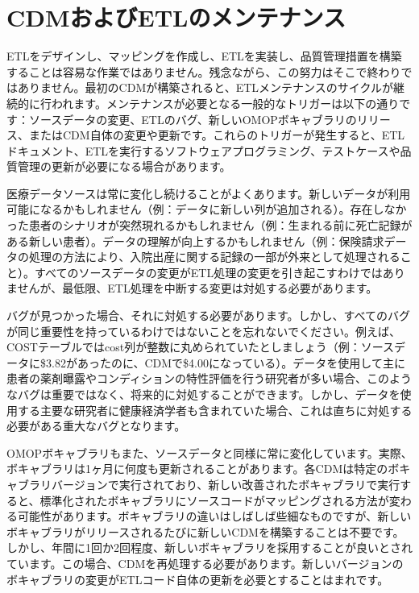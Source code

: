 \documentclass[
  11pt]{book}
\theoremstyle{definition}
\theoremstyle{definition}
\theoremstyle{definition}
\theoremstyle{definition}
\theoremstyle{remark}
\begin{document}
\section{CDMおよびETLのメンテナンス}\label{CDMandETLMaintenance}

ETLをデザインし、マッピングを作成し、ETLを実装し、品質管理措置を構築することは容易な作業ではありません。残念ながら、この努力はそこで終わりではありません。最初のCDMが構築されると、ETLメンテナンスのサイクルが継続的に行われます。メンテナンスが必要となる一般的なトリガーは以下の通りです：ソースデータの変更、ETLのバグ、新しいOMOPボキャブラリのリリース、またはCDM自体の変更や更新です。これらのトリガーが発生すると、ETLドキュメント、ETLを実行するソフトウェアプログラミング、テストケースや品質管理の更新が必要になる場合があります。

医療データソースは常に変化し続けることがよくあります。新しいデータが利用可能になるかもしれません（例：データに新しい列が追加される）。存在しなかった患者のシナリオが突然現れるかもしれません（例：生まれる前に死亡記録がある新しい患者）。データの理解が向上するかもしれません（例：保険請求データの処理の方法により、入院出産に関する記録の一部が外来として処理されること）。すべてのソースデータの変更がETL処理の変更を引き起こすわけではありませんが、最低限、ETL処理を中断する変更は対処する必要があります。

バグが見つかった場合、それに対処する必要があります。しかし、すべてのバグが同じ重要性を持っているわけではないことを忘れないでください。例えば、COSTテーブルではcost列が整数に丸められていたとしましょう（例：ソースデータに\$3.82があったのに、CDMで\$4.00になっている）。データを使用して主に患者の薬剤曝露やコンディションの特性評価を行う研究者が多い場合、このようなバグは重要ではなく、将来的に対処することができます。しかし、データを使用する主要な研究者に健康経済学者も含まれていた場合、これは直ちに対処する必要がある重大なバグとなります。

OMOPボキャブラリもまた、ソースデータと同様に常に変化しています。実際、ボキャブラリは1ヶ月に何度も更新されることがあります。各CDMは特定のボキャブラリバージョンで実行されており、新しい改善されたボキャブラリで実行すると、標準化されたボキャブラリにソースコードがマッピングされる方法が変わる可能性があります。ボキャブラリの違いはしばしば些細なものですが、新しいボキャブラリがリリースされるたびに新しいCDMを構築することは不要です。しかし、年間に1回か2回程度、新しいボキャブラリを採用することが良いとされています。この場合、CDMを再処理する必要があります。新しいバージョンのボキャブラリの変更がETLコード自体の更新を必要とすることはまれです。
\end{document}
